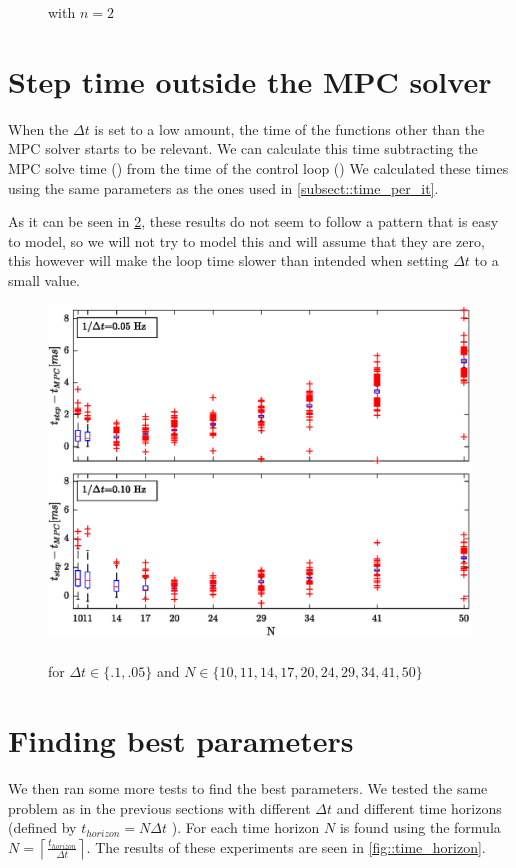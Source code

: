 \begin{figure}
\begin{minipage}{.5\textwidth}
		\caption[Scaling of $t_{it}/N$ when varying $n_{obs}$]{ with $n=2$}
		\label{fig::time_scaling_obs}
	\end{minipage}
\end{figure}


\section{Step time outside the \ac{MPC} solver}
\label{sect::step_time}
When the $\Delta t$ is set to a low amount, the time of the functions other than the \ac{MPC} solver starts to be relevant. We can calculate this time subtracting the \ac{MPC} solve time () from the time of the control loop () We calculated these times using the same parameters as the ones used in \cref{subsect::time_per_it}.

As it can be seen in \cref{fig::time_per_step}, these results do not seem to follow a pattern that is easy to model, so we will not try to model this and will assume that they are zero, this however will make the loop time slower than intended when setting $\Delta t$ to a small value.

\begin{figure}
	\centering
	\begin{center}
		\includegraphics[width=.7\linewidth]{Figures/time_per_step}
	\caption[Graph of $t_{step}-t_{MPC}$]{ \\ for $\Delta t\in\{.1,.05\}$ and $N\in\{10,11,14,17,20,24,29,34,41,50\}$}
	\label{fig::time_per_step}
	\end{center}
\end{figure}

\section{Finding best parameters}
We then ran some more tests to find the best parameters. We tested the same problem as in the previous sections with different $\Delta t$ and different time horizons (defined by $t_{horizon}=N\Delta t$ ). For each time horizon $N$ is found using the formula $N=\left\lceil\frac{t_{horizon}}{\Delta t}\right\rceil$. The results of these experiments are seen in \cref{fig::time_horizon}.

